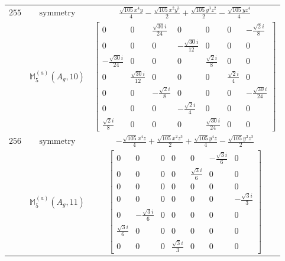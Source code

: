 \documentclass[fleqn,8pt,landscape]{jsarticle}
\begin{document}
\begin{longtable}{ccc}
$ 255 $ & $ \text{symmetry} $ & $ \frac{\sqrt{105} x^{4} y}{4} - \frac{\sqrt{105} x^{2} y^{3}}{2} + \frac{\sqrt{105} y^{3} z^{2}}{2} - \frac{\sqrt{105} y z^{4}}{4} $ \\
$  $ & $ \mathbb{M}_{5}^{(a)}(A_{g},10) $ & $ \begin{bmatrix} 0 & 0 & \frac{\sqrt{30} i}{24} & 0 & 0 & 0 & - \frac{\sqrt{2} i}{8} \\ 0 & 0 & 0 & - \frac{\sqrt{30} i}{12} & 0 & 0 & 0 \\ - \frac{\sqrt{30} i}{24} & 0 & 0 & 0 & \frac{\sqrt{2} i}{8} & 0 & 0 \\ 0 & \frac{\sqrt{30} i}{12} & 0 & 0 & 0 & \frac{\sqrt{2} i}{4} & 0 \\ 0 & 0 & - \frac{\sqrt{2} i}{8} & 0 & 0 & 0 & - \frac{\sqrt{30} i}{24} \\ 0 & 0 & 0 & - \frac{\sqrt{2} i}{4} & 0 & 0 & 0 \\ \frac{\sqrt{2} i}{8} & 0 & 0 & 0 & \frac{\sqrt{30} i}{24} & 0 & 0 \end{bmatrix} $ \\ \hline
$ 256 $ & $ \text{symmetry} $ & $ - \frac{\sqrt{105} x^{4} z}{4} + \frac{\sqrt{105} x^{2} z^{3}}{2} + \frac{\sqrt{105} y^{4} z}{4} - \frac{\sqrt{105} y^{2} z^{3}}{2} $ \\
$  $ & $ \mathbb{M}_{5}^{(a)}(A_{g},11) $ & $ \begin{bmatrix} 0 & 0 & 0 & 0 & 0 & - \frac{\sqrt{3} i}{6} & 0 \\ 0 & 0 & 0 & 0 & \frac{\sqrt{3} i}{6} & 0 & 0 \\ 0 & 0 & 0 & 0 & 0 & 0 & 0 \\ 0 & 0 & 0 & 0 & 0 & 0 & - \frac{\sqrt{3} i}{3} \\ 0 & - \frac{\sqrt{3} i}{6} & 0 & 0 & 0 & 0 & 0 \\ \frac{\sqrt{3} i}{6} & 0 & 0 & 0 & 0 & 0 & 0 \\ 0 & 0 & 0 & \frac{\sqrt{3} i}{3} & 0 & 0 & 0 \end{bmatrix} $ \\ \hline
\end{longtable}
\end{document}
